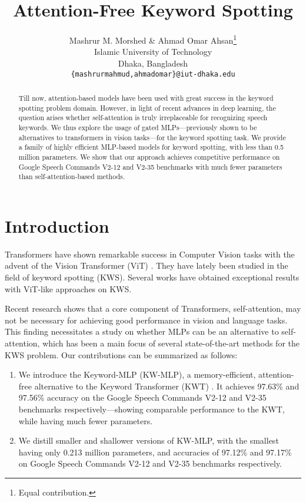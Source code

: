 \documentclass{article} \usepackage{iclr2022_conference,times}
\title{Attention-Free Keyword Spotting}
\author{Mashrur M. Morshed \& Ahmad Omar Ahsan\thanks{Equal contribution.} \\
Islamic University of Technology \\ 
Dhaka, Bangladesh \\
\texttt{\{mashrurmahmud,ahmadomar\}@iut-dhaka.edu}}
\begin{document}
\maketitle

\begin{abstract}
Till now, attention-based models have been used with great success in the keyword spotting problem domain. However, in light of recent advances in deep learning, the question arises whether self-attention is truly irreplaceable for recognizing speech keywords. We thus explore the usage of gated MLPs---previously shown to be alternatives to transformers in vision tasks---for the keyword spotting task. We provide a family of highly efficient MLP-based models for keyword spotting, with less than 0.5 million parameters. We show that our approach achieves competitive performance on Google Speech Commands V2-12 and V2-35 benchmarks with much fewer parameters than self-attention-based methods.

\end{abstract}

\section{Introduction}





Transformers \citep{vaswani2017attention} have shown remarkable success in Computer Vision tasks with the advent of the Vision Transformer (ViT) \citep{dosovitskiy2020image}. They have lately been studied in the field of keyword spotting (KWS). Several works \citep{berg21_interspeech,gong2021ast} have obtained exceptional results with ViT-like approaches on KWS.

 Recent research \citep{tolstikhin2021mlp,liu2021pay,melas2021you,touvron2021resmlp} shows that a core component of Transformers, self-attention, may not be necessary for achieving good performance in vision and language tasks. This finding necessitates a study on whether MLPs can be an alternative to self-attention, which has been a main focus of several state-of-the-art methods for the KWS problem. Our contributions can be summarized as follows:

\begin{enumerate}

\item We introduce the Keyword-MLP (KW-MLP), a memory-efficient, attention-free alternative to the Keyword Transformer (KWT) \citep{berg21_interspeech}. It achieves 97.63\% and 97.56\% accuracy on the Google Speech Commands V2-12 and V2-35 benchmarks \citep{warden2018speech} respectively---showing comparable performance to the KWT, while having much fewer parameters.

\item We distill smaller and shallower versions of KW-MLP, with the smallest having only 0.213 million parameters, and accuracies of 97.12\% and 97.17\% on Google Speech Commands V2-12 and V2-35 benchmarks respectively.

\end{enumerate}
\end{document}
